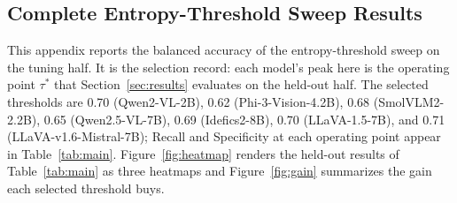 \documentclass[pdflatex,sn-basic,Numbered]{sn-jnl}
\theoremstyle{thmstyleone}
\theoremstyle{thmstyletwo}
\theoremstyle{thmstylethree}
\begin{document}
\begin{appendices}

\section{Complete Entropy-Threshold Sweep Results}\label{app:sweep}

This appendix reports the balanced accuracy of the entropy-threshold sweep on the tuning half. It is the selection record: each model's peak here is the operating point $\tau^{*}$ that Section~\ref{sec:results} evaluates on the held-out half. The selected thresholds are 0.70 (Qwen2-VL-2B), 0.62 (Phi-3-Vision-4.2B), 0.68 (SmolVLM2-2.2B), 0.65 (Qwen2.5-VL-7B), 0.69 (Idefics2-8B), 0.70 (LLaVA-1.5-7B), and 0.71 (LLaVA-v1.6-Mistral-7B); Recall and Specificity at each operating point appear in Table~\ref{tab:main}. Figure~\ref{fig:heatmap} renders the held-out results of Table~\ref{tab:main} as three heatmaps and Figure~\ref{fig:gain} summarizes the gain each selected threshold buys.


\end{appendices}
\end{document}
